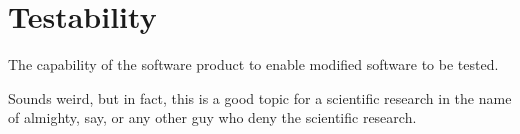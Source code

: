 \section{Testability}
\label{sec:Testability}

The capability of the software product to enable modified software to be tested.

Sounds weird, but in fact, this is a good topic for a scientific research in the name of almighty, say,  or any other guy who deny the scientific research.
